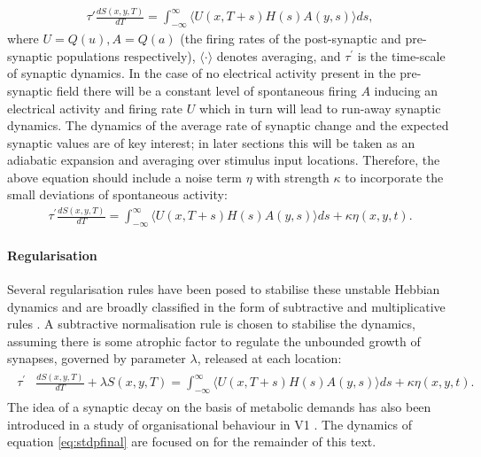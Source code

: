 \begin{align}
	\tau'\frac{dS(x,y,T)}{dT} = \int_{-\infty}^{\infty} \langle U(x,T+s)H(s)A(y,s) \rangle ds, \label{eq:robinson}
\end{align}
where $U=Q(u), A=Q(a)$ (the firing rates of the post-synaptic and pre-synaptic populations respectively), $\langle \cdot \rangle$ denotes averaging, and $\tau^\prime$ is the time-scale of synaptic dynamics. In the case of no electrical activity present in the pre-synaptic field there will be a constant level of spontaneous firing $A$ inducing an electrical activity and firing rate $U$ which in turn will lead to run-away synaptic dynamics. The dynamics of the average rate of synaptic change and the expected synaptic values are of key interest; in later sections this will be taken as an adiabatic expansion and averaging over stimulus input locations. Therefore, the above equation should include a noise term $\eta$ with strength $\kappa$ to incorporate the small deviations of spontaneous activity:
\begin{align}
	\tau^\prime\frac{dS(x,y,T)}{dT} = \int_{-\infty}^{\infty} \langle U(x,T+s)H(s)A(y,s) \rangle ds + \kappa\eta(x,y,t).
\end{align}
\paragraph{Regularisation}
Several regularisation rules have been posed to stabilise these unstable Hebbian dynamics and are broadly classified in the form of subtractive and multiplicative rules \cite{Abbott2000-gl}. A subtractive normalisation rule is chosen to stabilise the dynamics, assuming there is some atrophic factor to regulate the unbounded growth of synapses, governed by parameter $\lambda$, released at each location:
\begin{align}
	\begin{split}
		\tau^\prime&\frac{dS(x,y,T)}{dT} + \lambda S(x,y,T)=  \int_{-\infty}^{\infty} \langle U(x,T+s)H(s)A(y,s) \rangle ds + \kappa\eta(x,y,t).
	\end{split}
	\label{eq:stdpfinal}
\end{align}
The idea of a synaptic decay on the basis of metabolic demands has also been introduced in a study of organisational behaviour in V1 \cite{Wright2013-td}. The dynamics of equation \ref{eq:stdpfinal} are focused on for the remainder of this text.
